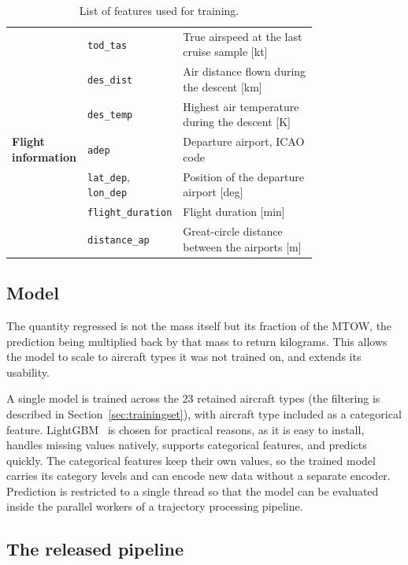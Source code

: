 \documentclass[
  manuscript=proceedings,  %
  layout=preprint,  %
  year=2026,
  volume=x,
]{extra/joas}
\begin{document}
\begin{table}[htbp]
\begin{tabular}{@{}lp{0.22\linewidth}p{0.55\linewidth}@{}}
    & \texttt{tod\_tas} & True airspeed at the last cruise sample [kt] \\
    & \texttt{des\_dist} & Air distance flown during the descent [km] \\
    & \texttt{des\_temp} & Highest air temperature during the descent [K] \\[3pt]
\midrule
    \textbf{Flight information}
        & \texttt{adep} & Departure airport, ICAO code \\
    & \texttt{lat\_dep}, \texttt{lon\_dep} & Position of the departure airport [deg] \\
    & \texttt{flight\_duration} & Flight duration [min] \\
    & \texttt{distance\_ap} & Great-circle distance between the airports [m] \\

    \bottomrule
    \end{tabular}
    \caption{List of features used for training.}
    \label{tab:features}
\end{table}

\subsection{Model}

The quantity regressed is not the mass itself but its fraction of the MTOW, the prediction being multiplied back by that mass to return kilograms. This allows the model to scale to aircraft types it was not trained on, and extends its usability.

A single model is trained across the 23 retained aircraft types (the filtering is described in Section~\ref{sec:trainingset}), with aircraft type included as a categorical feature. LightGBM~\cite{lgbm} is chosen for practical reasons, as it is easy to install, handles missing values natively, supports categorical features, and predicts quickly. The categorical features keep their own values, so the trained model carries its category levels and can encode new data without a separate encoder. Prediction is restricted to a single thread so that the model can be evaluated inside the parallel workers of a trajectory processing pipeline.

\subsection{The released pipeline}
\label{sec:released}
\end{document}
